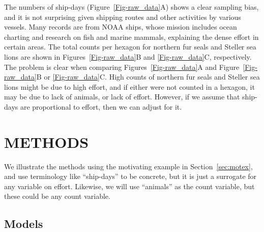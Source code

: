 \documentclass[11pt, titlepage]{article}
\begin{document}
\begin{spacing}{1.9}
\begin{flushleft}
The numbers of ship-days (Figure~\ref{Fig-raw_data}A) shows a clear sampling bias, and it is not surprising given shipping routes and other activities by various vessels.  Many records are from NOAA ships, whose mission includes ocean charting and research on fish and marine mammals, explaining the dense effort in certain areas.  The total counts per hexagon for northern fur seals and Steller sea lions are shown in Figures~\ref{Fig-raw_data}B and \ref{Fig-raw_data}C, respectively.  The problem is clear when comparing Figures~\ref{Fig-raw_data}A and Figure~\ref{Fig-raw_data}B or \ref{Fig-raw_data}C.  High counts of northern fur seals and Steller sea lions might be due to high effort, and if either were not counted in a hexagon, it may be due to lack of animals, or lack of effort.  However, if we assume that ship-days are proportional to effort, then we can adjust for it.



\section{METHODS}

We illustrate the methods using the motivating example in Section~\ref{sec:motex}, and use terminology like ``ship-days'' to be concrete, but it is just a surrogate for any variable on effort.  Likewise, we will use ``animals'' as the count variable, but these could be any count variable.


\subsection{Models}


\end{flushleft}
\end{spacing}
\end{document}
